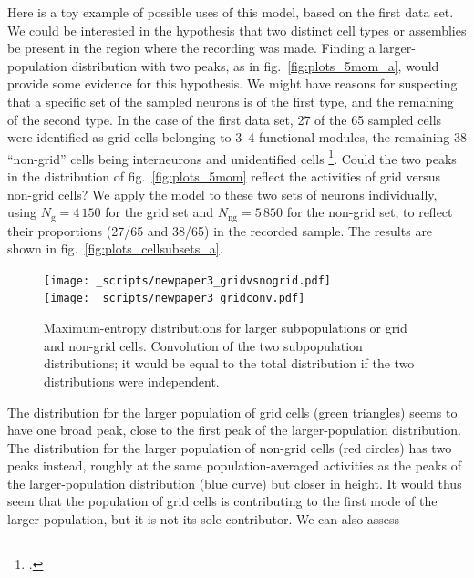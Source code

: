 \documentclass[\ifafour a4paper,12pt,\else a5paper,10pt,\fi%
onecolumn,oneside,article,%
british%
]{memoir}
\theoremstyle{remark}
\theoremstyle{innote}
\newcommand*{\citep}{\footcites}
\renewcommand*{\|}{\nonscript\,\vert\nonscript\;\mathopen{}}
\newcommand*{\fig}{fig.}%
\newcommand*{\yNg}{N_{\text{g}}}
\newcommand*{\yNng}{N_{\text{ng}}}
\begin{document}
Here is a toy example of possible uses of this model, based on the first
data set. We could be interested in the hypothesis that two distinct cell
types or assemblies be present in the region where the recording was made.
Finding a larger-population distribution with two peaks, as in
\fig~\ref{fig:plots_5mom_a}, would provide some evidence for this
hypothesis. We might have reasons for suspecting that a specific set of the
sampled neurons is of the first type, and the remaining of the second type.
In the case of the first data set, 27 of the 65 sampled cells were
identified as grid cells belonging to 3--4 functional modules, the
remaining 38 \enquote{non-grid} cells being interneurons and unidentified
cells \citep{stensolaetal2012}. Could the two peaks in the distribution of
\fig~\ref{fig:plots_5mom} reflect the activities of grid versus non-grid
cells? We apply the model to these two sets of neurons individually, using
$\yNg=4\,150$ for the grid set and $\yNng=5\,850$ for the non-grid set, to
reflect their proportions (27/65 and 38/65) in the recorded sample. The
results are shown in \fig~\ref{fig:plots_cellsubsets_a}.
\begin{figure}[!p]
\centering
\subcaption[]{\label{fig:plots_cellsubsets_a}}%
\texttt{[image: \_scripts/newpaper3\_gridvsnogrid.pdf]}%
\\[2em]%
\subcaption[]{\label{fig:plots_cellsubsets_b}}%
\texttt{[image: \_scripts/newpaper3\_gridconv.pdf]}%
\\[2em]%
\caption{ Maximum-entropy
  distributions for larger subpopulations or grid and non-grid cells.
   Convolution of the two
  subpopulation distributions; it would be equal to the total distribution
  if the two distributions were independent.}
\label{fig:plots_cellsubsets}
\end{figure}
The distribution for the larger population of grid cells
(\textcolor{mygreen}{green triangles}) seems to have one broad peak, close
to the first peak of the larger-population distribution. The distribution
for the larger population of non-grid cells (\textcolor{myred}{red
  circles}) has two peaks instead, roughly at the same population-averaged
activities as the peaks of the larger-population distribution
(\textcolor{myblue}{blue curve}) but closer in height. It would thus seem
that the population of grid cells is contributing to the first mode of the
larger population, but it is not its sole contributor. We can also assess
\end{document}
